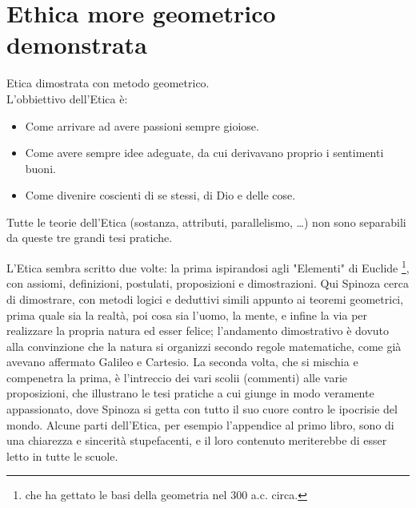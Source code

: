 \chapter{Ethica more geometrico demonstrata}
Etica dimostrata con metodo geometrico.\\
L'obbiettivo dell'Etica è:\begin{itemize}
	\item Come arrivare ad avere passioni sempre gioiose.
	\item Come avere sempre idee adeguate, da cui derivavano proprio i sentimenti buoni.
	\item Come divenire coscienti di se stessi, di Dio e delle cose.
\end{itemize}
Tutte le teorie dell'Etica (sostanza, attributi, parallelismo, \dots) non sono separabili da queste tre grandi tesi pratiche.

L'Etica sembra scritto due volte: la prima ispirandosi agli "Elementi" di Euclide \footnote{che ha gettato le basi della geometria nel 300 a.c. circa.}, con assiomi, definizioni, postulati, proposizioni e dimostrazioni. Qui Spinoza cerca di dimostrare, con metodi logici e deduttivi simili appunto ai teoremi geometrici, prima quale sia la realtà, poi cosa sia l'uomo, la mente, e infine la via per realizzare la propria natura ed esser felice; l'andamento dimostrativo è dovuto alla convinzione che la natura si organizzi secondo regole matematiche, come già avevano affermato Galileo e Cartesio. La seconda volta, che si mischia e compenetra la prima, è l'intreccio dei vari scolii (commenti) alle varie proposizioni, che illustrano le tesi pratiche a cui giunge in modo veramente appassionato, dove Spinoza si getta con tutto il suo cuore contro le ipocrisie del mondo. Alcune parti dell'Etica, per esempio l'appendice al primo libro, sono di una chiarezza e sincerità stupefacenti, e il loro contenuto meriterebbe di esser letto in tutte le scuole.
\newpage

